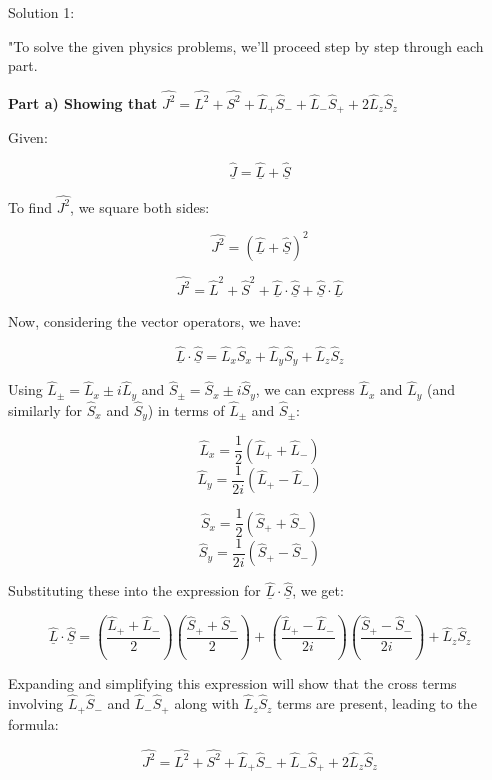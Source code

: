 Solution 1:

"To solve the given physics problems, we'll proceed step by step through each part.

\textbf{Part a) Showing that} \( \hat{J^{2}} = \hat{L^{2}} + \hat{S^{2}} + \hat{L}_{+}\hat{S}_{-} + \hat{L}_{-}\hat{S}_{+} + 2\hat{L}_{z}\hat{S}_{z} \)

Given:

\[ \hat{\underline{J}} = \hat{\underline{L}} + \hat{\underline{S}} \]

To find \( \hat{J^{2}} \), we square both sides:

\[ \hat{J^{2}} = (\hat{\underline{L}} + \hat{\underline{S}})^2 \]

\[ \hat{J^{2}} = \hat{L}^2 + \hat{S}^2 + \hat{\underline{L}} \cdot \hat{\underline{S}} + \hat{\underline{S}} \cdot \hat{\underline{L}} \]

Now, considering the vector operators, we have:

\[ \hat{\underline{L}} \cdot \hat{\underline{S}} = \hat{L}_{x}\hat{S}_{x} + \hat{L}_{y}\hat{S}_{y} + \hat{L}_{z}\hat{S}_{z} \]

Using \( \hat{L}_{\pm} = \hat{L}_{x} \pm i\hat{L}_{y} \) and \( \hat{S}_{\pm} = \hat{S}_{x} \pm i\hat{S}_{y} \), we can express \( \hat{L}_{x} \) and \( \hat{L}_{y} \) (and similarly for \( \hat{S}_{x} \) and \( \hat{S}_{y} \)) in terms of \( \hat{L}_{\pm} \) and \( \hat{S}_{\pm} \):

\[ \hat{L}_{x} = \frac{1}{2}(\hat{L}_{+} + \hat{L}_{-}) \]
\[ \hat{L}_{y} = \frac{1}{2i}(\hat{L}_{+} - \hat{L}_{-}) \]

\[ \hat{S}_{x} = \frac{1}{2}(\hat{S}_{+} + \hat{S}_{-}) \]
\[ \hat{S}_{y} = \frac{1}{2i}(\hat{S}_{+} - \hat{S}_{-}) \]

Substituting these into the expression for \( \hat{\underline{L}} \cdot \hat{\underline{S}} \), we get:

\[ \hat{\underline{L}} \cdot \hat{\underline{S}} = \left( \frac{\hat{L}_{+} + \hat{L}_{-}}{2} \right) \left( \frac{\hat{S}_{+} + \hat{S}_{-}}{2} \right) + \left( \frac{\hat{L}_{+} - \hat{L}_{-}}{2i} \right) \left( \frac{\hat{S}_{+} - \hat{S}_{-}}{2i} \right) + \hat{L}_{z}\hat{S}_{z} \]

Expanding and simplifying this expression will show that the cross terms involving \( \hat{L}_{+}\hat{S}_{-} \) and \( \hat{L}_{-}\hat{S}_{+} \) along with \( \hat{L}_{z}\hat{S}_{z} \) terms are present, leading to the formula:

\[ \hat{J^{2}} = \hat{L^{2}} + \hat{S^{2}} + \hat{L}_{+}\hat{S}_{-} + \hat{L}_{-}\hat{S}_{+} + 2\hat{L}_{z}\hat{S}_{z} \]

